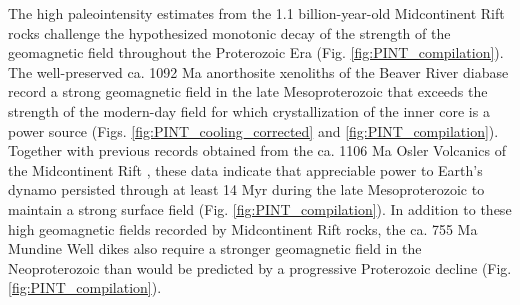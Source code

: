 \documentclass[9pt,twocolumn,twoside,lineno]{pnas-new}
\begin{document}
The high paleointensity estimates from the 1.1 billion-year-old Midcontinent Rift rocks challenge the hypothesized monotonic decay of the strength of the geomagnetic field throughout the Proterozoic Era (Fig. \ref{fig:PINT_compilation}). The well-preserved ca. 1092 Ma anorthosite xenoliths of the Beaver River diabase record a strong geomagnetic field in the late Mesoproterozoic that exceeds the strength of the modern-day field for which crystallization of the inner core is a power source (Figs. \ref{fig:PINT_cooling_corrected} and \ref{fig:PINT_compilation}). Together with previous records obtained from the ca. 1106 Ma Osler Volcanics of the Midcontinent Rift \cite{Sprain2018a}, these data indicate that appreciable power to Earth's dynamo persisted through at least 14 Myr during the late Mesoproterozoic to maintain a strong surface field (Fig. \ref{fig:PINT_compilation}). In addition to these high geomagnetic fields recorded by Midcontinent Rift rocks, the ca. 755 Ma Mundine Well dikes \cite{Lloyd2021b} also require a stronger geomagnetic field in the Neoproterozoic than would be predicted by a progressive Proterozoic decline (Fig. \ref{fig:PINT_compilation}). 
\end{document}
